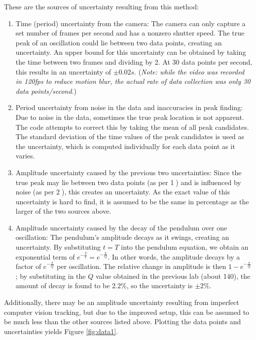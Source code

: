 \documentclass[aps,twocolumn,secnumarabic,nobalancelastpage,amsmath,amssymb,nofootinbib,floatfix]{revtex4}
\begin{document}
These are the sources of uncertainty resulting from this method:
\begin{enumerate}
    \item Time (period) uncertainty from the camera: The camera can only capture a set number of frames per second and
          has a nonzero shutter speed. The true peak of an oscillation could lie between two data points, creating an
          uncertainty. An upper bound for this uncertainty can be obtained by taking the time between two frames and
          dividing by 2. At 30 data points per second, this results in an uncertainty of \(\pm 0.02\si{s}\).
          (\textit{Note: while the video was recorded in 120fps to reduce motion blur, the actual rate of data
          collection was only 30 data points/second.})
    \item Period uncertainty from noise in the data and inaccuracies in peak finding: Due to noise in the data,
          sometimes the true peak location is not apparent. The code attempts to correct this by taking the mean of all
          peak candidates. The standard deviation of the time values of the peak candidates is used as the uncertainty,
          which is computed individually for each data point as it varies.
    \item Amplitude uncertainty caused by the previous two uncertainties: Since the true peak may lie between two data
          points (as per \textcircled{1}) and is influenced by noise (as per \textcircled{2}), this creates an
          uncertainty. As the exact value of this uncertainty is hard to find, it is assumed to be the same in
          percentage as the larger of the two sources above.
    \item Amplitude uncertainty caused by the decay of the pendulum over one oscillation: The pendulum's amplitude
          decays as it swings, creating an uncertainty. By substituting $t = T$ into the pendulum equation, we obtain
          an exponential term of $e^{-\frac{T}{t}} = e^{-\frac{\pi}{Q}}$. In other words, the amplitude decays by a
          factor of $e^{-\frac{\pi}{Q}}$ per oscillation. The relative change in amplitude is then
          $1 - e^{-\frac{\pi}{Q}}$; by substituting in the $Q$ value obtained in the previous lab (about 140), the
          amount of decay is found to be $2.2\%$, so the uncertainty is \(\pm 2\%\).
\end{enumerate}

Additionally, there may be an amplitude uncertainty resulting from imperfect computer vision tracking, but due to the
improved setup, this can be assumed to be much less than the other sources listed above. Plotting the data points and
uncertainties yields Figure \ref{fig:data1}.
\end{document}
